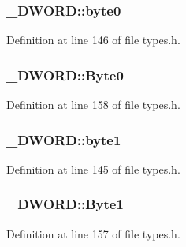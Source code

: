 \subsubsection[{\texorpdfstring{byte0}{byte0}}]{ \+\_\+\+D\+W\+O\+R\+D\+::byte0}\hypertarget{union___d_w_o_r_d_a1f2ec2b51fa732b65371bc99bbab021f}{}\label{union___d_w_o_r_d_a1f2ec2b51fa732b65371bc99bbab021f}


Definition at line 146 of file types.\+h.

\subsubsection[{\texorpdfstring{Byte0}{Byte0}}]{ \+\_\+\+D\+W\+O\+R\+D\+::\+Byte0}\hypertarget{union___d_w_o_r_d_ae3e29036d675c90ac9d965ae258878d6}{}\label{union___d_w_o_r_d_ae3e29036d675c90ac9d965ae258878d6}


Definition at line 158 of file types.\+h.

\subsubsection[{\texorpdfstring{byte1}{byte1}}]{ \+\_\+\+D\+W\+O\+R\+D\+::byte1}\hypertarget{union___d_w_o_r_d_ad8d15d0b4c659a8247cfba038137a747}{}\label{union___d_w_o_r_d_ad8d15d0b4c659a8247cfba038137a747}


Definition at line 145 of file types.\+h.

\subsubsection[{\texorpdfstring{Byte1}{Byte1}}]{ \+\_\+\+D\+W\+O\+R\+D\+::\+Byte1}\hypertarget{union___d_w_o_r_d_ad023bbdcb677a0d6ca5877abe3940cdb}{}\label{union___d_w_o_r_d_ad023bbdcb677a0d6ca5877abe3940cdb}


Definition at line 157 of file types.\+h.

